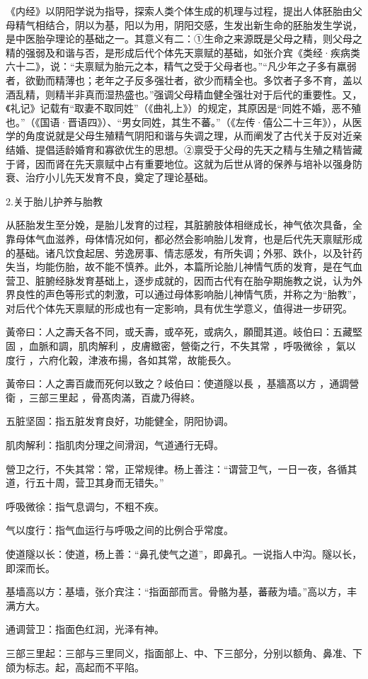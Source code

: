 \documentclass[draft,12pt]{ctexbook}
\begin{document}
《内经》以阴阳学说为指导，探索人类个体生成的机理与过程，提出人体胚胎由父母精气相结合，阴以为基，阳以为用，阴阳交感，生发出新生命的胚胎发生学说，是中医胎孕理论的基础之一。其意义有二：①生命之来源既是父母之精，则父母之精的强弱及和谐与否，是形成后代个体先天禀赋的基础，如张介宾《类经·疾病类六十二》，说：“夫禀赋为胎元之本，精气之受于父母者也。”“凡少年之子多有羸弱者，欲勤而精薄也；老年之子反多强壮者，欲少而精全也。多饮者子多不育，盖以酒乱精，则精半非真而湿热盛也。”强调父母精血健全强壮对于后代的重要性。又，《礼记》记载有“取妻不取同姓”（《曲礼上》）的规定，其原因是“同姓不婚，恶不殖也。”（《国语·晋语四》）、“男女同姓，其生不蕃。”（《左传·僖公二十三年》），从医学的角度说就是父母生殖精气阴阳和谐与失调之理，从而阐发了古代关于反对近亲结婚、提倡适龄婚育和寡欲优生的思想。②禀受于父母的先天之精与生殖之精皆藏于肾，因而肾在先天禀赋中占有重要地位。这就为后世从肾的保养与培补以强身防衰、治疗小儿先天发育不良，奠定了理论基础。

2.关于胎儿护养与胎教

从胚胎发生至分娩，是胎儿发育的过程，其脏腑肢体相继成长，神气依次具备，全靠母体气血滋养，母体情况如何，都必然会影响胎儿发育，也是后代先天禀赋形成的基础。诸凡饮食起居、劳逸房事、情志感发，有所失调；外邪、跌仆，以及针药失当，均能伤胎，故不能不慎养。此外，本篇所论胎儿神情气质的发育，是在气血营卫、脏腑经脉发育基础上，逐步成就的，因而古代有在胎孕期施教之说，认为外界良性的声色等形式的刺激，可以通过母体影响胎儿神情气质，并称之为“胎教”，对后代个体先天禀赋的形成也有一定影响，具有优生学意义，值得进一步研究。


\begin{yuanwen}
黃帝曰：人之壽夭各不同，或夭壽，或卒死，或病久，願聞其道。岐伯曰：五藏堅固 ，血脈和調，肌肉解利 ，皮膚緻密，營衛之行，不失其常 ，呼吸微徐 ，氣以度行 ，六府化榖，津液布揚，各如其常，故能長久。

黃帝曰：人之壽百歲而死何以致之？岐伯曰：使道隧以長 ，基牆髙以方 ，通調營衛 ，三部三里起 ，骨髙肉滿，百歲乃得終。
\end{yuanwen}


\begin{jiaozhu}
	\item 五脏坚固：指五脏发育良好，功能健全，阴阳协调。
	\item 肌肉解利：指肌肉分理之间滑润，气道通行无碍。
	\item 營卫之行，不失其常：常，正常规律。杨上善注：“谓营卫气，一日一夜，各循其道，行五十周，营卫其身而无错失。”
	\item 呼吸微徐：指气息调匀，不粗不疾。
	\item 气以度行：指气血运行与呼吸之间的比例合乎常度。
	\item 使道隧以长：使道，杨上善：“鼻孔使气之道”，即鼻孔。一说指人中沟。隧以长，即深而长。
	\item 基墙高以方：基墙，张介宾注：“指面部而言。骨骼为基，蕃蔽为墙。”高以方，丰满方大。
	\item 通调营卫：指面色红润，光泽有神。
	\item 三部三里起：三部与三里同义，指面部上、中、下三部分，分别以额角、鼻准、下颌为标志。起，高起而不平陷。
\end{jiaozhu}
\end{document}
